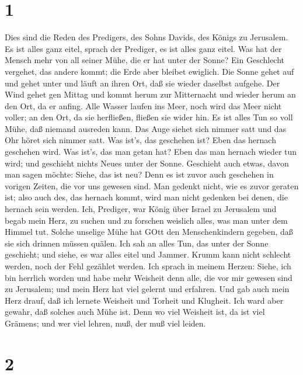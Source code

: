 \hypertarget{section}{%
\section{1}\label{section}}

 Dies sind die Reden des Predigers, des Sohns Davids, des
Königs zu Jerusalem.  Es ist alles ganz eitel, sprach der
Prediger, es ist alles ganz eitel.  Was hat der Mensch mehr
von all seiner Mühe, die er hat unter der Sonne?  Ein
Geschlecht vergehet, das andere kommt; die Erde aber bleibet ewiglich.
 Die Sonne gehet auf und gehet unter und läuft an ihren Ort,
daß sie wieder daselbst aufgehe.  Der Wind gehet gen Mittag
und kommt herum zur Mitternacht und wieder herum an den Ort, da er
anfing.  Alle Wasser laufen ins Meer, noch wird das Meer
nicht voller; an den Ort, da sie herfließen, fließen sie wider hin.
 Es ist alles Tun so voll Mühe, daß niemand ausreden kann.
Das Auge siehet sich nimmer satt und das Ohr höret sich nimmer satt.
 Was ist's, das geschehen ist? Eben das hernach geschehen
wird. Was ist's, das man getan hat? Eben das man hernach wieder tun
wird; und geschieht nichts Neues unter der Sonne. 
Geschieht auch etwas, davon man sagen möchte: Siehe, das ist neu? Denn
es ist zuvor auch geschehen in vorigen Zeiten, die vor uns gewesen sind.
 Man gedenkt nicht, wie es zuvor geraten ist; also auch
des, das hernach kommt, wird man nicht gedenken bei denen, die hernach
sein werden.  Ich, Prediger, war König über Israel zu
Jerusalem  und begab mein Herz, zu suchen und zu forschen
weislich alles, was man unter dem Himmel tut. Solche unselige Mühe hat
GOtt den Menschenkindern gegeben, daß sie sich drinnen müssen quälen.
 Ich sah an alles Tun, das unter der Sonne geschieht; und
siehe, es war alles eitel und Jammer.  Krumm kann nicht
schlecht werden, noch der Fehl gezählet werden.  Ich sprach
in meinem Herzen: Siehe, ich bin herrlich worden und habe mehr Weisheit
denn alle, die vor mir gewesen sind zu Jerusalem; und mein Herz hat viel
gelernt und erfahren.  Und gab auch mein Herz drauf, daß
ich lernete Weisheit und Torheit und Klugheit. Ich ward aber gewahr, daß
solches auch Mühe ist.  Denn wo viel Weisheit ist, da ist
viel Grämens; und wer viel lehren, muß, der muß viel leiden.

\hypertarget{section-1}{%
\section{2}\label{section-1}}

